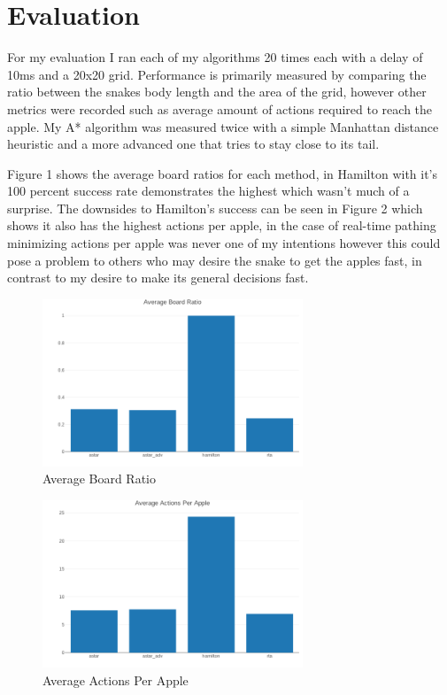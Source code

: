 \documentclass[letterpaper]{article} %
\begin{document}
\section{Evaluation}
For my evaluation I ran each of my algorithms 20 times each with a delay of 10ms and a 20x20 grid. Performance is primarily measured by comparing the ratio between the snakes body length and the area of the grid, however other metrics were recorded such as average amount of actions required to reach the apple. My A* algorithm was measured twice with a simple Manhattan distance heuristic and a more advanced one that tries to stay close to its tail.

 Figure 1 shows the average board ratios for each method, in Hamilton with it's 100 percent success rate demonstrates the highest which wasn't much of a surprise. The downsides to Hamilton's success can be seen in Figure 2 which shows it also has the highest actions per apple, in the case of real-time pathing minimizing actions per apple was never one of my intentions however this could pose a problem to others who may desire the snake to get the apples fast, in contrast to my desire to make its general decisions fast.

\begin{figure}[h]
  \centering
  \includegraphics[height=5cm]{../graphs/avg_board_ratio}
  \caption{Average Board Ratio}
  \label{fig:board_ratio}
\end{figure}

\begin{figure}[h]
  \centering
  \includegraphics[height=5cm]{../graphs/avg_actions_per_apple}
  \caption{Average Actions Per Apple}
  \label{fig:actions_per_apple}
\end{figure}
\end{document}
